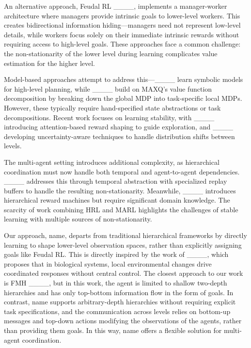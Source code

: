 An alternative approach, Feudal RL ____, implements a manager-worker architecture where managers provide intrinsic goals to lower-level workers. This creates bidirectional information hiding—managers need not represent low-level details, while workers focus solely on their immediate intrinsic rewards without requiring access to high-level goals. These approaches face a common challenge: the non-stationarity of the lower level during learning complicates value estimation for the higher level.

Model-based approaches attempt to address this—____ learn symbolic models for high-level planning, while ____ build on MAXQ’s value function decomposition by breaking down the global MDP into task-specific local MDPs. However, these typically require hand-specified state abstractions or task decompositions. Recent work focuses on learning stability, with ____ introducing attention-based reward shaping to guide exploration, and ____ developing uncertainty-aware techniques to handle distribution shifts between levels.

The multi-agent setting introduces additional complexity, as hierarchical coordination must now handle both temporal and agent-to-agent dependencies. ____ addresses this through temporal abstraction with specialized replay buffers to handle the resulting non-stationarity. Meanwhile, ____ introduces hierarchical reward machines but require significant domain knowledge. The scarcity of work combining HRL and MARL highlights the challenges of stable learning with multiple sources of non-stationarity.

Our approach, \gls{name}, departs from traditional hierarchical frameworks by directly learning to shape lower-level observation spaces, rather than explicitly assigning goals like Feudal RL. This is directly inspired by the work of ____, which proposes that in biological systems, local environmental changes drive coordinated responses without central control. The closest approach to our work is FMH ____, but in this work, the agent is limited to shallow two-depth hierarchies and has only top-bottom information flow in the form of goals. In contrast, \gls{name} supports arbitrary-depth hierarchies without requiring explicit task specifications, and the communication across levels relies on bottom-up messages and top-down actions modifying the observations of the agents, rather than providing them goals. In this way, \gls{name} offers a flexible solution for multi-agent coordination.